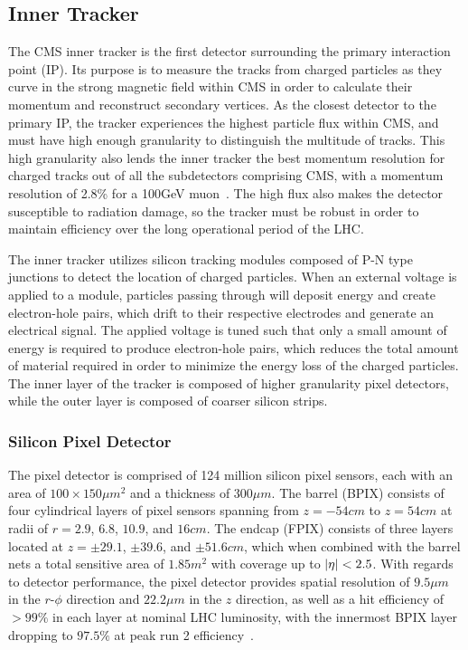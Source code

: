 \subsection{Inner Tracker} \label{sec:CMS_tracker}
The CMS inner tracker is the first detector surrounding the primary interaction point (IP). Its purpose is to measure the tracks from charged particles as they curve in the strong magnetic field within CMS in order to calculate their momentum and reconstruct secondary vertices. As the closest detector to the primary IP, the tracker experiences the highest particle flux within CMS, and must have high enough granularity to distinguish the multitude of tracks. This high granularity also lends the inner tracker the best momentum resolution for charged tracks out of all the subdetectors comprising CMS, with a momentum resolution of 2.8\% for a 100\unit{GeV} muon~\cite{The_CMS_Collaboration_2014}. The high flux also makes the detector susceptible to radiation damage, so the tracker must be robust in order to maintain efficiency over the long operational period of the LHC. 

The inner tracker utilizes silicon tracking modules composed of P-N type junctions to detect the location of charged particles. When an external voltage is applied to a module, particles passing through will deposit energy and create electron-hole pairs, which drift to their respective electrodes and generate an electrical signal. The applied voltage is tuned such that only a small amount of energy is required to produce electron-hole pairs, which reduces the total amount of material required in order to minimize the energy loss of the charged particles. The inner layer of the tracker is composed of higher granularity pixel detectors, while the outer layer is composed of coarser silicon strips.

\subsubsection{Silicon Pixel Detector} \label{sec:CMS_pixel}
The pixel detector is comprised of 124 million silicon pixel sensors, each with an area of $100\times150\unit{\mu m^2}$ and a thickness of $300\unit{\mu m}$. The barrel (BPIX) consists of four cylindrical layers of pixel sensors spanning from $z=-54\unit{cm}$ to $z=54\unit{cm}$ at radii of $r=2.9$, $6.8$, $10.9$, and $16\unit{cm}$. The endcap (FPIX) consists of three layers located at $z=\pm29.1$, $\pm39.6$, and $\pm51.6\unit{cm}$, which when combined with the barrel nets a total sensitive area of $1.85\unit{m^2}$ with coverage up to $\abs{\eta}<2.5$. With regards to detector performance, the pixel detector provides spatial resolution of $9.5 \unit{\mu m}$ in the $r$-$\phi$ direction and $22.2 \unit{\mu m}$ in the $z$ direction, as well as a hit efficiency of $>99\%$ in each layer at nominal LHC luminosity, with the innermost BPIX layer dropping to $97.5\%$ at peak run 2 efficiency~\cite{CMSPixelP1}.

